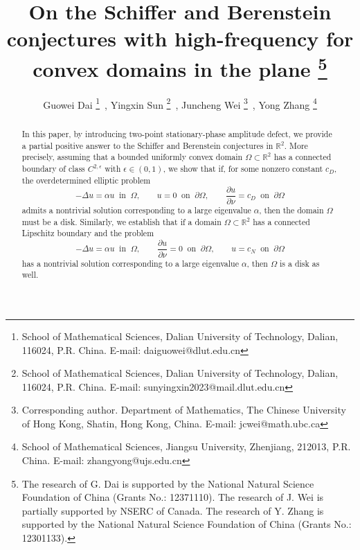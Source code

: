 \documentclass[12pt]{article}
\numberwithin{equation}{section}
\numberwithin{equation}{section}
\begin{document}
\title{On the Schiffer and Berenstein conjectures with high-frequency for convex domains in the plane
\thanks{The research of G. Dai is supported by the National Natural Science Foundation of China (Grants No.: 12371110).  The research of J. Wei is partially supported by NSERC of Canada. The research of Y. Zhang is supported by the National Natural Science Foundation of China (Grants No.: 12301133).}}
\author{Guowei Dai
\thanks{School of Mathematical Sciences, Dalian University of Technology, Dalian, 116024, P.R. China. E-mail: daiguowei@dlut.edu.cn} \,,
Yingxin Sun
\thanks{School of Mathematical Sciences, Dalian University of Technology, Dalian, 116024, P.R. China. E-mail: sunyingxin2023@mail.dlut.edu.cn} \,,
Juncheng Wei
\thanks{Corresponding author. Department of Mathematics, The Chinese University of Hong Kong,
Shatin, Hong Kong, China. E-mail: jcwei@math.ubc.ca}  \,,
Yong Zhang
\thanks{School of Mathematical Sciences, Jiangsu University, Zhenjiang, 212013, P.R. China. E-mail: zhangyong@ujs.edu.cn}
}
\date{}
\maketitle

\renewcommand{\abstractname}{Abstract}

\begin{abstract}
In this paper, by introducing two-point stationary-phase amplitude defect, we provide a partial positive answer to the Schiffer and Berenstein conjectures in $\mathbb{R}^2$. More precisely, assuming that a bounded uniformly
convex domain $\Omega \subset \mathbb{R}^2$ has a connected boundary of class $C^{2,\epsilon}$ with $\epsilon \in (0,1)$, we show that if, for some nonzero constant $c_D$, the overdetermined elliptic problem
\begin{equation}
-\Delta u = \alpha u \ \text{ in } \ \Omega, \qquad u = 0 \ \text{ on } \ \partial\Omega, \qquad \frac{\partial u}{\partial \nu} = c_{D} \ \text{ on } \ \partial\Omega  \nonumber
\end{equation}
admits a nontrivial solution corresponding to a large eigenvalue $\alpha$, then the domain $\Omega$ must be a disk. Similarly, we establish that if a domain $\Omega \subset \mathbb{R}^2$ has a connected Lipschitz boundary and the problem
\begin{equation}
-\Delta u = \alpha u \ \text{ in } \ \Omega, \qquad \frac{\partial u}{\partial \nu} = 0 \ \text{ on } \ \partial\Omega, \qquad u = c_{N} \ \text{ on } \ \partial\Omega \nonumber
\end{equation}
has a nontrivial solution corresponding to a large eigenvalue $\alpha$, then $\Omega$ is a disk as well.
\end{abstract}
\end{document}

